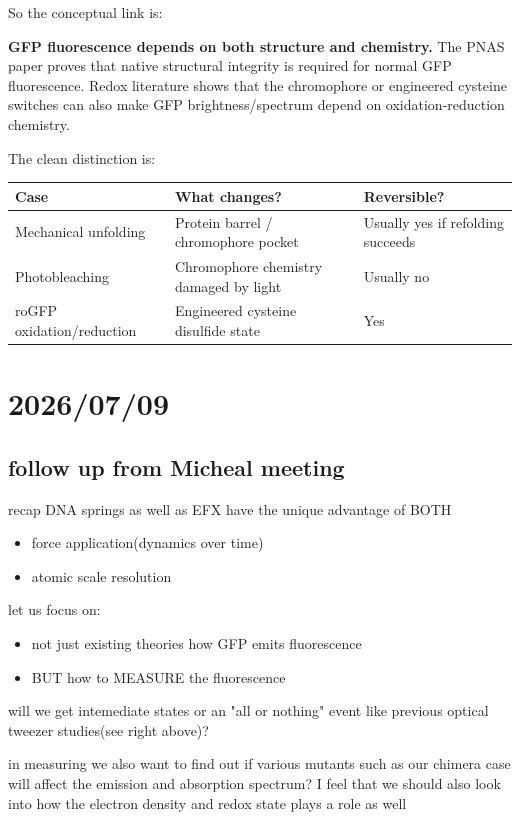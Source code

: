 \documentclass{article}
\begin{document}
So the conceptual link is:

\textbf{GFP fluorescence depends on both structure and chemistry.}
The PNAS paper proves that native structural integrity is required for normal GFP fluorescence. Redox literature shows that the chromophore or engineered cysteine switches can also make GFP brightness/spectrum depend on oxidation-reduction chemistry.

The clean distinction is:

\begin{table}[H]\noindent\begin{tabularx}{\linewidth}{LLL}
\hline
Case & What changes? & Reversible? \\ \hline
Mechanical unfolding & Protein barrel / chromophore pocket & Usually yes if refolding succeeds \\ \hline
Photobleaching & Chromophore chemistry damaged by light & Usually no \\ \hline
roGFP oxidation/reduction & Engineered cysteine disulfide state & Yes \\ \hline
\end{tabularx}\end{table}

\section{2026/07/09}
\subsection{follow up from Micheal meeting}
\begin{fact}
 recap DNA springs as well as EFX have the unique advantage of BOTH 
 \begin{itemize}
   \item force application(dynamics over time)
   \item atomic scale resolution
 \end{itemize}
\end{fact}

\begin{problem}
let us focus on:
\begin{itemize}
  \item not just existing theories how GFP emits fluorescence
  \item BUT how to MEASURE the fluorescence
\end{itemize}
\end{problem}
will we get intemediate states or an "all or nothing" event like previous optical tweezer studies(see right above)?
\begin{remark}
 in measuring we also want to find out if various mutants such as our chimera case will affect the emission and absorption spectrum? I feel that we should also look into how the electron density and redox state plays a role as well 
\end{remark}
\end{document}

